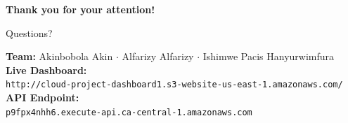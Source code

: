 \documentclass[aspectratio=169,11pt]{beamer}
\begin{document}
\begin{frame}

\begin{center}
\begin{block}{}
\centering
\textbf{Thank you for your attention!}
\end{block}

\vspace{0.5em}
{\normalsize Questions?}

\vspace{1em}
{\small
\textbf{Team:} Akinbobola Akin $\cdot$ Alfarizy Alfarizy $\cdot$ Ishimwe Pacis Hanyurwimfura\\[0.5em]
\textbf{Live Dashboard:}\\
\texttt{http://cloud-project-dashboard1.s3-website-us-east-1.amazonaws.com/}\\[0.5em]
\textbf{API Endpoint:}\\
\texttt{p9fpx4nhh6.execute-api.ca-central-1.amazonaws.com}
}
\end{center}
\end{frame}
\end{document}

